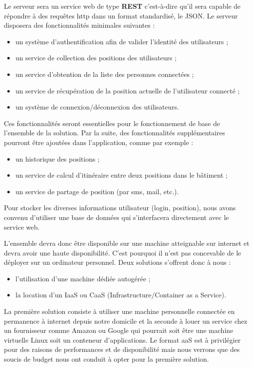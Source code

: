 Le serveur sera un service web de type \textbf{REST} c’est-à-dire qu’il sera capable de répondre à des requêtes http dans un format standardisé, le JSON.
Le serveur disposera des fonctionnalités minimales suivantes :

\begin{itemize}
    \item un système d’authentification afin de valider l’identité des utilisateurs ;
    \item un service de collection des positions des utilisateurs ;
    \item un service d’obtention de la liste des personnes connectées ;
    \item un service de récupération de la position actuelle de l'utilisateur connecté ;
    \item un système de connexion/déconnexion des utilisateurs.
\end{itemize}

Ces fonctionnalités seront essentielles pour le fonctionnement de base de l'ensemble de la solution. Par la suite, des fonctionnalités supplémentaires pourront être ajoutées dans l'application, comme par exemple :

\begin{itemize}
    \item un historique des positions ;
    \item un service de calcul d'itinéraire entre deux positions dans le bâtiment ;
    \item un service de partage de position (par sms, mail, etc.).
\end{itemize}

Pour stocker les diverses informations utilisateur (login, position), nous avons convenu d'utiliser une base de données qui s'interfacera directement avec le service web.

L’ensemble devra donc être disponible sur une machine atteignable sur internet et devra avoir une haute disponibilité. C’est pourquoi il n’est pas concevable de le déployer sur un ordinateur personnel. Deux solutions s’offrent donc à nous :

\begin{itemize}
    \item l’utilisation d’une machine dédiée autogérée ;
    \item la location d’un IaaS ou CaaS (Infrastructure/Container as a Service).
\end{itemize}

La première solution consiste à utiliser une machine personnelle connectée en permanence à internet depuis notre domicile et la seconde à louer un service chez un fournisseur comme Amazon ou Google qui pourrait soit être une machine virtuelle Linux soit un conteneur d’applications. Le format aaS est à privilégier pour des raisons de performances et de disponibilité mais nous verrons que des soucis de budget nous ont conduit à opter pour la première solution.

